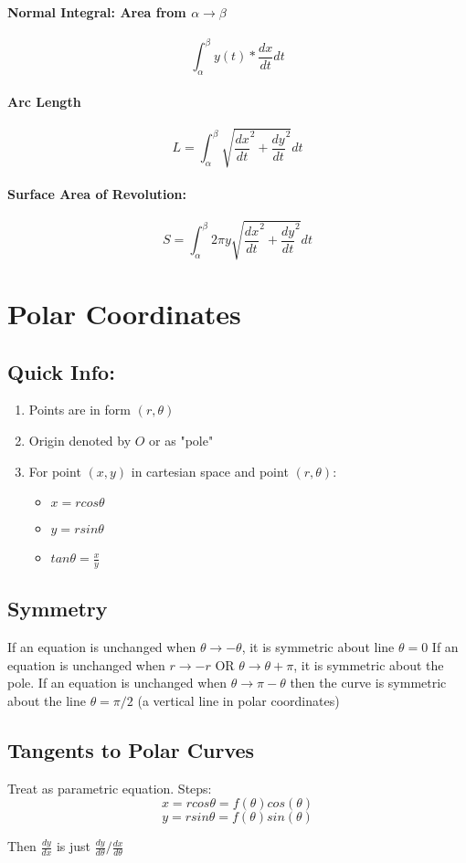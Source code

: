 \documentclass[a4paper,12pt]{report}
\begin{document}
\subsubsection{Normal Integral: Area from $\alpha \to \beta$}
$$\int_{\alpha}^{\beta}y(t)*\frac{dx}{dt}dt$$
\subsubsection{Arc Length}
$$L = \int_{\alpha}^{\beta} \sqrt{ \frac{dx}{dt}^2 + \frac{dy}{dt}^2 }dt$$
\subsubsection{Surface Area of Revolution: }
$$S = \int_{\alpha}^{\beta} 2\pi y \sqrt{\frac{dx}{dt}^2 + \frac{dy}{dt}^2}dt$$



\chapter{Polar Coordinates}
\section{Quick Info: }
\begin{enumerate}
\item Points are in form $(r, \theta)$
\item Origin denoted by $O$ or as "pole"
\item For point $(x, y)$ in cartesian space and point $(r, \theta)$:
\begin{itemize}
\item $x = r cos \theta$
\item $y = r sin \theta$
\item $tan \theta = \frac{x}{y}$
\end{itemize}
\end{enumerate}

\section{Symmetry}
If an equation is unchanged when $\theta \to -\theta$, it is symmetric about line $\theta = 0$
If an equation is unchanged when $r \to -r$ OR $\theta \to \theta + \pi$, it is symmetric about the pole.
If an equation is unchanged when $\theta \to \pi - \theta$ then the curve is symmetric about the line $\theta = \pi/2$ (a vertical line in polar coordinates)

\section{Tangents to Polar Curves}
Treat as parametric equation. Steps:
$$ x = r cos \theta = f(\theta) cos (\theta)$$
$$ y = r sin \theta = f(\theta) sin (\theta)$$

Then $\frac{dy}{dx}$ is just $\frac{dy}{d\theta}/\frac{dx}{d\theta}$
\end{document}
